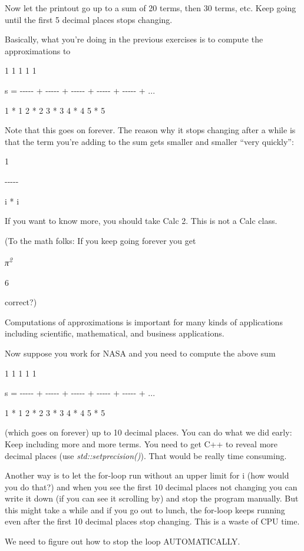 \documentclass[
]{article}
\begin{document}
Now let the printout go up to a sum of 20 terms, then 30 terms, etc.
Keep going until the first 5 decimal places stops changing.

Basically, what you're doing in the previous exercises is to compute the
approximations to

1 1 1 1 1

s = -\/-\/-\/-\/- + -\/-\/-\/-\/- + -\/-\/-\/-\/- + -\/-\/-\/-\/- +
-\/-\/-\/-\/- + ...

1 * 1 2 * 2 3 * 3 4 * 4 5 * 5

Note that this goes on forever. The reason why it stops changing after a
while is that the term you're adding to the sum gets smaller and smaller
``very quickly'':

1

-\/-\/-\/-\/-

i * i

If you want to know more, you should take Calc 2. This is not a Calc
class.

(To the math folks: If you keep going forever you get

\emph{π}\textsuperscript{\emph{2}}

6

correct?)

Computations of approximations is important for many kinds of
applications including scientific, mathematical, and business
applications.

Now suppose you work for NASA and you need to compute the above sum

1 1 1 1 1

s = -\/-\/-\/-\/- + -\/-\/-\/-\/- + -\/-\/-\/-\/- + -\/-\/-\/-\/- +
-\/-\/-\/-\/- + ...

1 * 1 2 * 2 3 * 3 4 * 4 5 * 5

(which goes on forever) up to 10 decimal places. You can do what we did
early: Keep including more and more terms. You need to get C++ to reveal
more decimal places (use \emph{std::setprecision()}). That would be
really time consuming.

Another way is to let the for-loop run without an upper limit for i (how
would you do that?) and when you see the first 10 decimal places not
changing you can write it down (if you can see it scrolling by) and stop
the program manually. But this might take a while and if you go out to
lunch, the for-loop keeps running even after the first 10 decimal places
stop changing. This is a waste of CPU time.

We need to figure out how to stop the loop AUTOMATICALLY.
\end{document}
